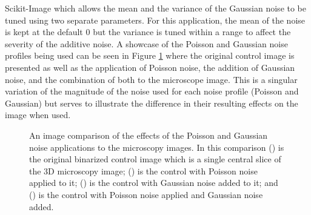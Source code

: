 Scikit-Image which allows the mean and the variance of the Gaussian noise to be tuned using two separate parameters. For this application, the mean of the noise is kept at the default $0$ but the variance is tuned within a range to affect the severity of the additive noise. A showcase of the Poisson and Gaussian noise profiles being used can be seen in Figure \ref{fig:noise_application_compare} where the original control image is presented as well as the application of Poisson noise, the addition of Gaussian noise, and the combination of both to the microscope image. This is a singular variation of the magnitude of the noise used for each noise profile (Poisson and Gaussian) but serves to illustrate the difference in their resulting effects on the image when used. 
\begin{figure}[h!]
    \centering
    \caption[Comparison of the different noise profiles applied to the binarized control images]{An image comparison of the effects of the Poisson and Gaussian noise applications to the microscopy images. In this comparison () is the original binarized control image which is a single central slice of the 3D microscopy image; () is the control with Poisson noise applied to it; () is the control with Gaussian noise added to it; and () is the control with Poisson noise applied and Gaussian noise added.}
    \label{fig:noise_application_compare}
\end{figure}
